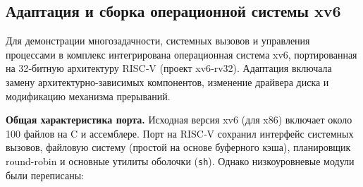 \subsection{Адаптация и сборка операционной системы xv6}

Для демонстрации многозадачности, системных вызовов и управления процессами в комплекс интегрирована операционная система xv6, портированная на 32‑битную архитектуру RISC‑V (проект xv6‑rv32). Адаптация включала замену архитектурно-зависимых компонентов, изменение драйвера диска и модификацию механизма прерываний.

\textbf{Общая характеристика порта.} Исходная версия xv6 (для x86) включает около 100 файлов на C и ассемблере. Порт на RISC‑V сохранил интерфейс системных вызовов, файловую систему (простой на основе буферного кэша), планировщик round-robin и основные утилиты оболочки (\texttt{sh}). Однако низкоуровневые модули были переписаны:

